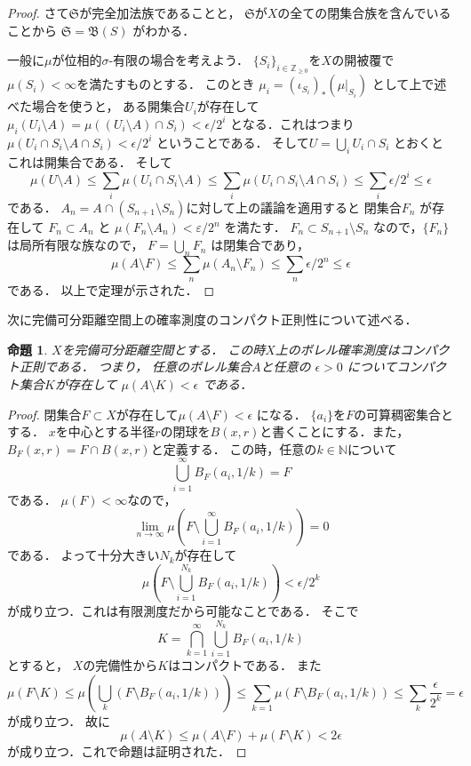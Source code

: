 \documentclass[leqno, a4paper, 12pt]{jsarticle}
\newtheorem{prop}[thm]{命題}
\newcommand{\nn}{\mathbb{N}}
\newcommand{\zz}{\mathbb{Z}}
\newcommand{\ep}{\varepsilon}
\begin{document}
\begin{proof}
さて$\mathfrak{S}$が完全加法族であることと，
$\mathfrak{S}$が$X$の全ての閉集合族を含んでいることから
$\mathfrak{S}=\mathfrak{B}(S)$
がわかる．

一般に$\mu$が位相的$\sigma$-有限の場合を考えよう．
$\{S_{i}\}_{i\in \zz_{\ge 0}}$を$X$の開被覆で$\mu(S_i)<\infty$を満たすものとする．
このとき
$\mu_i=(\iota_{S_i})_*(\mu|_{S_i})$
として上で述べた場合を使うと，
ある開集合$U_i$が存在して
$\mu_i(U_i\setminus A)=\mu((U_i\setminus A)\cap S_i)<\epsilon/2^i$
となる．これはつまり
$\mu(U_i\cap S_i\setminus A\cap S_i)<\epsilon/2^i$
ということである．
そして$U=\bigcup_{i}U_i\cap S_i$
とおくとこれは開集合である．
そして
\[
	\mu(U\setminus A)
	\le 
	\sum_i \mu(U_i\cap S_i\setminus A)
	\le 
	\sum_i \mu(U_i\cap S_i\setminus A\cap S_i)
	\le 
	\sum_{i}\epsilon/2^i
	\le \epsilon
\]
である．
$A_n=A\cap (S_{n+1}\setminus S_n)$に対して上の議論を適用すると
閉集合$F_n$
が存在して $F_n\subset A_n$
と
$\mu(F_n\setminus A_n)<\ep/2^n$
を満たす．
$F_n\subset S_{n+1}\setminus S_n$
なので，$\{F_n\}$
は局所有限な族なので，
$F=\bigcup_nF_n$
は閉集合であり，
\[
\mu(A\setminus F)\le \sum_n\mu(A_n\setminus F_n)\le \sum_n \epsilon/2^n\le \epsilon
\]
である．
以上で定理が示された．
\end{proof}


次に完備可分距離空間上の確率測度のコンパクト正則性について述べる．
\begin{prop}\label{prop:cptreg}
$X$を完備可分距離空間とする．
この時$X$上のボレル確率測度はコンパクト正則である．
つまり，
任意のボレル集合$A$と任意の
$\epsilon>0$
についてコンパクト集合$K$が存在して
$\mu(A\setminus K)<\epsilon$
である．
\end{prop}
\begin{proof}
閉集合$F\subset X$が存在して$\mu(A\setminus F)<\epsilon$
になる．
$\{a_i\}$を$F$の可算稠密集合とする．
$x$を中心とする半径$r$の閉球を$B(x, r)$と書くことにする．また，$B_{F}(x, r)=F\cap B(x, r)$と定義する．
この時，任意の$k\in \nn$について
\[
\bigcup_{i=1}^{\infty}B_{F}(a_i, 1/k)=F
\]
である．
$\mu(F)<\infty$なので，
\[
	\lim_{n\to \infty}
	\mu\left(F\setminus \bigcup_{i=1}^{\infty}B_{F}(a_i, 1/k)\right)
	=0
\]
である．
よって十分大きい$N_k$が存在して
\[
\mu\left(F\setminus\bigcup_{i=1}^{N_k}B_{F}(a_i, 1/k) \right)<\epsilon/2^k
\]
が成り立つ．これは有限測度だから可能なことである．
そこで
\[
K=\bigcap_{k=1}^{\infty}\bigcup_{i=1}^{N_k}B_{F}(a_i, 1/k)
\]
とすると， $X$の完備性から$K$はコンパクトである．
また
\[
	\mu(F\setminus K)
	\le 
	\mu\left(\bigcup_{k}(F\setminus B_{F}(a_i, 1/k))\right)
	\le
	\sum_{k=1}\mu(F\setminus B_{F}(a_i, 1/k))
	\le 
	\sum_k\frac{\epsilon}{2^{k}}
	=\epsilon 
\]
が成り立つ．
故に
\[
\mu(A\setminus K)\le \mu(A\setminus F)+\mu(F\setminus K)<2\epsilon
\]
が成り立つ．これで命題は証明された．
\end{proof}
\end{document}
